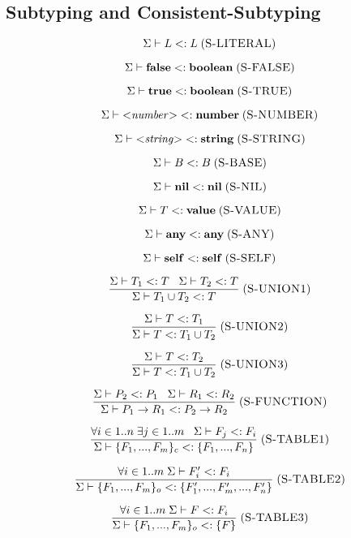 \subsection{Subtyping and Consistent-Subtyping}

\[
\Sigma \vdash L <: L
\; (\textsc{S-LITERAL})
\]

\[
\Sigma \vdash \mathbf{false} <: \mathbf{boolean}
\; (\textsc{S-FALSE})
\]

\[
\Sigma \vdash \mathbf{true} <: \mathbf{boolean}
\; (\textsc{S-TRUE})
\]

\[
\Sigma \vdash {<}{\it number}{>} <: \mathbf{number}
\; (\textsc{S-NUMBER})
\]

\[
\Sigma \vdash {<}{\it string}{>} <: \mathbf{string}
\; (\textsc{S-STRING})
\]

\[
\Sigma \vdash B <: B
\; (\textsc{S-BASE})
\]

\[
\Sigma \vdash \mathbf{nil} <: \mathbf{nil}
\; (\textsc{S-NIL})
\]

\[
\Sigma \vdash T <: \mathbf{value}
\; (\textsc{S-VALUE})
\]

\[
\Sigma \vdash \mathbf{any} <: \mathbf{any}
\; (\textsc{S-ANY})
\]

\[
\Sigma \vdash \mathbf{self} <: \mathbf{self}
\; (\textsc{S-SELF})
\]

\[
\frac{\Sigma \vdash T_{1} <: T \;\;\;
      \Sigma \vdash T_{2} <: T}
     {\Sigma \vdash T_{1} \cup T_{2} <: T}
\; (\textsc{S-UNION1})
\]

\[
\frac{\Sigma \vdash T <: T_{1}}
     {\Sigma \vdash T <: T_{1} \cup T_{2}}
\; (\textsc{S-UNION2})
\]

\[
\frac{\Sigma \vdash T <: T_{2}}
     {\Sigma \vdash T <: T_{1} \cup T_{2}}
\; (\textsc{S-UNION3})
\]

\[
\frac{\Sigma \vdash P_{2} <: P_{1} \;\;\;
      \Sigma \vdash R_{1} <: R_{2}}
     {\Sigma \vdash P_{1} \rightarrow R_{1} <: P_{2} \rightarrow R_{2}}
\; (\textsc{S-FUNCTION})
\]

\[
\frac{\forall i \in 1..n \; \exists j \in 1..m \;\;\;
      \Sigma \vdash F_{j} <: F_{i}}
     {\Sigma \vdash \{F_{1}, ..., F_{m}\}_{c} <: \{F_{1}, ..., F_{n}\}}
\; (\textsc{S-TABLE1})
\]

\[
\frac{\forall i \in 1..m \; \Sigma \vdash F_{i}' <: F_{i}}
     {\Sigma \vdash \{F_{1}, ..., F_{m}\}_{o} <: \{F_{1}', ..., F_{m}', ..., F_{n}'\}}
\; (\textsc{S-TABLE2})
\]

\[
\frac{\forall i \in 1..m \; \Sigma \vdash F <: F_{i}}
     {\Sigma \vdash \{F_{1}, ..., F_{m}\}_{o} <: \{F\}} 
\; (\textsc{S-TABLE3})
\]

